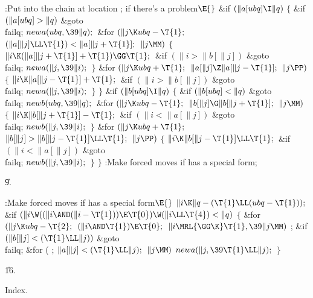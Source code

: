 \Y\B\4:Put  into the chain at location ;  if there's a problem\X${}\E{}$\6
\&{if} ${}(\|a[\\{ubq}]\I\|q){}$\5
${}\{{}$\1\6
\&{if} ${}(\|a[\\{ubq}]>\|q){}$\1\5
\&{goto} \\{failq};\2\6
${}\\{newa}(\\{ubq},\39\|q);{}$\6
\&{for} ${}(\|j\K\\{ubq}-\T{1};{}$ ${}(\|a[\|j]\LL\T{1})<\|a[\|j+\T{1}];{}$ ${}%
\|j\MM){}$\5
${}\{{}$\1\6
${}\|i\K(\|a[\|j+\T{1}]+\T{1})\GG\T{1};{}$\6
\&{if} ${}(\|i>\|b[\|j]){}$\1\5
\&{goto} \\{failq};\2\6
${}\\{newa}(\|j,\39\|i);{}$\6
\4${}\}{}$\2\6
\&{for} ${}(\|j\K\\{ubq}+\T{1};{}$ ${}\|a[\|j]\Z\|a[\|j-\T{1}];{}$ ${}\|j%
\PP){}$\5
${}\{{}$\1\6
${}\|i\K\|a[\|j-\T{1}]+\T{1};{}$\6
\&{if} ${}(\|i>\|b[\|j]){}$\1\5
\&{goto} \\{failq};\2\6
${}\\{newa}(\|j,\39\|i);{}$\6
\4${}\}{}$\2\6
\4${}\}{}$\2\6
\&{if} ${}(\|b[\\{ubq}]\I\|q){}$\5
${}\{{}$\1\6
\&{if} ${}(\|b[\\{ubq}]<\|q){}$\1\5
\&{goto} \\{failq};\2\6
${}\\{newb}(\\{ubq},\39\|q);{}$\6
\&{for} ${}(\|j\K\\{ubq}-\T{1};{}$ ${}\|b[\|j]\G\|b[\|j+\T{1}];{}$ ${}\|j%
\MM){}$\5
${}\{{}$\1\6
${}\|i\K\|b[\|j+\T{1}]-\T{1};{}$\6
\&{if} ${}(\|i<\|a[\|j]){}$\1\5
\&{goto} \\{failq};\2\6
${}\\{newb}(\|j,\39\|i);{}$\6
\4${}\}{}$\2\6
\&{for} ${}(\|j\K\\{ubq}+\T{1};{}$ ${}\|b[\|j]>\|b[\|j-\T{1}]\LL\T{1};{}$ ${}%
\|j\PP){}$\5
${}\{{}$\1\6
${}\|i\K\|b[\|j-\T{1}]\LL\T{1};{}$\6
\&{if} ${}(\|i<\|a[\|j]){}$\1\5
\&{goto} \\{failq};\2\6
${}\\{newb}(\|j,\39\|i);{}$\6
\4${}\}{}$\2\6
\4${}\}{}$\2\6
:Make forced moves if  has a special form\X;\par
\U9.\fi

\B{}:Make forced moves if  has a special form\X${}\E{}$\6
$\|i\K\|q-(\T{1}\LL(\\{ubq}-\T{1}));{}$\6
\&{if} ${}(\|i\W((\|i\AND(\|i-\T{1}))\E\T{0})\W(\|i\LL\T{4})<\|q){}$\5
${}\{{}$\1\6
\&{for} ${}(\|j\K\\{ubq}-\T{2};{}$ ${}(\|i\AND\T{1})\E\T{0};{}$ ${}\|i\MRL{{%
\GG}{\K}}\T{1},\39\|j\MM){}$\1\5
;\2\6
\&{if} ${}(\|b[\|j]<(\T{1}\LL\|j)){}$\1\5
\&{goto} \\{failq};\2\6
\&{for} ( ; ${}\|a[\|j]<(\T{1}\LL\|j);{}$ ${}\|j\MM){}$\1\5
${}\\{newa}(\|j,\39\T{1}\LL\|j);{}$\2\6
\4${}\}{}$\2\par
\U16.\fi

Index.


\fi


\inx
\fin
\con
